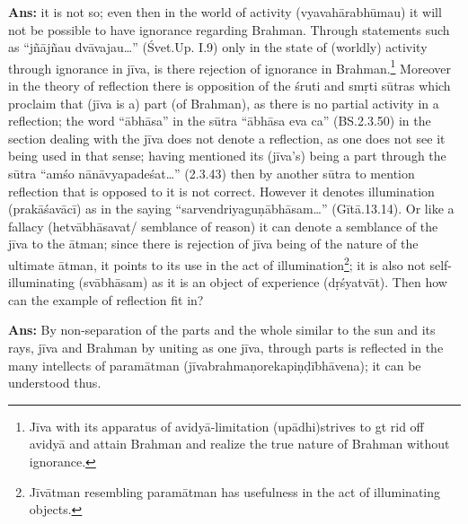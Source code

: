 \textbf{Ans:} it is not so; even then in the world of activity (vyavahārabhūmau) it will not be possible to have ignorance regarding Brahman.  Through statements such as “jñājñau dvāvajau…” (Śvet.Up. I.9) only in the state of (worldly) activity through ignorance in jīva, is there rejection of ignorance in Brahman.\footnote{Jīva with its apparatus of avidyā-limitation (upādhi)strives to gt rid off avidyā and attain Brahman and realize the true nature of Brahman without ignorance.} Moreover in the theory of reflection there is opposition of the śruti and smṛti sūtras which proclaim that (jīva is a) part (of Brahman), as there is no partial activity in a reflection;  the word “ābhāsa” in the sūtra “ābhāsa eva ca” (BS.2.3.50) in the section dealing with the jīva does not denote a reflection, as one does not see it being used in that sense; having mentioned its (jīva’s) being a part through the sūtra “amśo nānāvyapadeśat…” (2.3.43) then by another sūtra to mention reflection that is opposed to it is not correct. However it denotes illumination (prakāśavācī) as in the saying “sarvendriyaguṇābhāsam…” (Gītā.13.14). Or like a fallacy (hetvābhāsavat/ semblance of reason) it can denote a semblance of the jīva to the ātman;  since there is rejection of jīva being of the nature of the ultimate ātman, it points to its use in the act of illumination\footnote{Jīvātman resembling paramātman has usefulness in the act of illuminating objects.}; it is also not self-illuminating (svābhāsam) as it is an object of experience (dṛśyatvāt).   Then how can the example of reflection fit in? 

\textbf{Ans:} By non-separation of the parts and the whole similar to the sun and its rays, jīva and Brahman by uniting as one jīva, through parts is reflected in the many intellects of paramātman (jīvabrahmaṇorekapiṇḍībhāvena); it can be understood thus.


